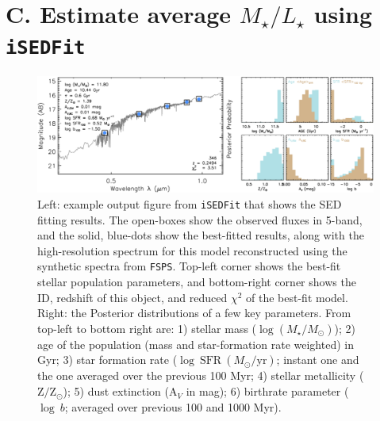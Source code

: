 \documentclass[a4paper,fleqn,usenatbib]{mnras}
\def\logms{{$\log (M_{\star}/M_{\odot})$}}
\begin{document}
\section{C. Estimate average {$M_{\star}/L_{\star}$} using \texttt{iSEDFit}} 
    \label{app:sed} 

    \begin{figure}
        \begin{center}
        \includegraphics[width=\textwidth]{fig/redbcg_isedfit_example.pdf}
        \caption{
            Left: example output figure from \texttt{iSEDFit} that shows the SED 
        	fitting results. 
            The open-boxes show the observed fluxes in 5-band, and the solid, blue-dots
            show the best-fitted results, along with the high-resolution spectrum for
            this model reconstructed using the synthetic spectra from \texttt{FSPS}. 
            Top-left corner shows the best-fit stellar population parameters, and 
            bottom-right corner shows the ID, redshift of this object, and reduced 
            $\chi^2$ of the best-fit model.~~~
            Right: the Posterior distributions of a few key parameters.
            From top-left to bottom right are: 1) stellar mass (\logms{}); 2) age of the 
            population (mass and star-formation rate weighted) in Gyr; 3) star formation 
            rate ($\log\ \mathrm{SFR}\ (M_{\odot}/\mathrm{yr})$; instant one and the one 
            averaged over the previous 100 Myr; 4) stellar metallicity 
            ($\mathrm{Z}/\mathrm{Z}_{\odot}$); 5) dust extinction ($\mathrm{A}_V$ in mag);
            6) birthrate parameter ($\log\ b$; averaged over previous 100 and 1000 Myr).
            }
        \label{fig:ised}
        \end{center}
    \end{figure}
\end{document}
